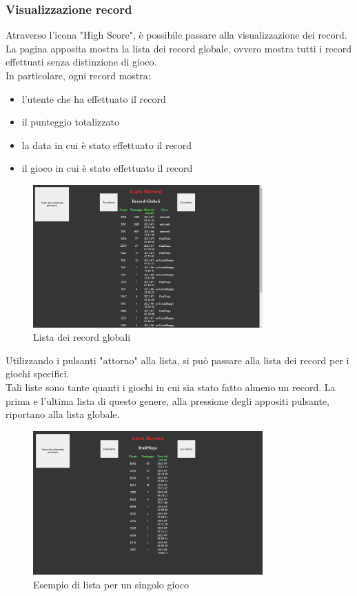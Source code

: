 \subsubsection{Visualizzazione record}
Atraverso l'icona "High Score", è possibile passare alla visualizzazione dei record.\\
La pagina apposita mostra la lista dei record globale, ovvero mostra tutti i record effettuati senza distinzione di gioco.\\
In particolare, ogni record mostra:
\begin{itemize}
    \item l'utente che ha effettuato il record
    \item il punteggio totalizzato
    \item la data in cui è stato effettuato il record
    \item il gioco in cui è stato effettuato il record
\end{itemize}
\begin{figure}[h]
    \centering
    \includegraphics[width=250pt]{images/product/schermataRecord.png}
    \caption{Lista dei record globali}
    \label{fig:schermataRecord}
\end{figure}
Utilizzando i pulsanti "attorno" alla lista, si può passare alla lista dei record per i giochi specifici.\\
Tali liste sono tante quanti i giochi in cui sia stato fatto almeno un record.
La prima e l'ultima lista di questo genere, alla pressione degli appositi pulsante, riportano alla lista globale.
\begin{figure}[h]
    \centering
    \includegraphics[width=250pt]{images/product/schermataRecordSingoloGioco.png}
    \caption{Esempio di lista per un singolo gioco}
    \label{fig:schermataRecordSingoloGioco}
\end{figure}
\newpage
